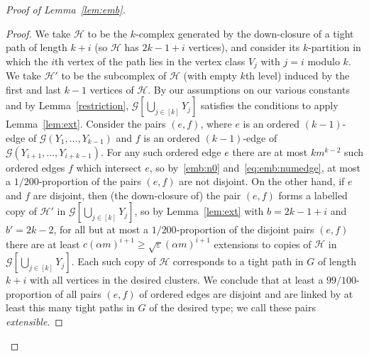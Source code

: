\documentclass[12pt,a4paper]{amsart}
\let\eps\varepsilon
\newcommand{\oldqed}{}
\def\endofClaim{\hfill\scalebox{.6}{$\Box$}}
\newenvironment{claimproof}[1][Proof]{
  \renewcommand{\oldqed}{\qedsymbol}
  \renewcommand{\qedsymbol}{\endofClaim}
  \begin{proof}[#1]
}{
  \end{proof}
  \renewcommand{\qedsymbol}{\oldqed}
}
\newcommand{\cG}{\mathcal{G}}
\begin{document}
\begin{proof}[Proof of Lemma~\ref{lem:emb}]
 \begin{claimproof}
  We take $\mathcal{H}$ to be the $k$-complex generated by the down-closure of a
  tight path of length $k+i$ (so $\mathcal{H}$ has $2k-1+i$ vertices), and
  consider its $k$-partition in which the $i$th vertex of the path lies in the
  vertex class $V_j$ with $j = i$ modulo $k$. We take $\mathcal{H'}$ to be the
  subcomplex of $\mathcal{H}$ (with empty $k$th level) induced by the first and last $k-1$
  vertices of $\mathcal{H}$. By our assumptions on our various constants and
  by Lemma~\ref{restriction}, $\cG[\bigcup_{j \in [k]} Y_j]$ satisfies the
  conditions to apply Lemma~\ref{lem:ext}. Consider the pairs $(e, f)$, where
  $e$ is an ordered $(k-1)$-edge of $\cG(Y_1,\ldots,Y_{k-1})$ and $f$ is an ordered $(k-1)$-edge of $\cG(Y_{i+1},\ldots,Y_{i + k-1})$. For any such ordered edge $e$ there
  are at most $k m^{k-2}$ such ordered edges $f$ which intersect $e$, so by~\eqref{emb:n0} and~\eqref{eq:emb:numedge}, at most
  a $1/200$-proportion of the pairs $(e, f)$ are not disjoint. On the other hand,
  if $e$ and $f$ are disjoint, then (the down-closure of) the pair $(e, f)$ forms a labelled copy of
  $\mathcal{H'}$ in $\cG[\bigcup_{j\in[k]} Y_j]$, so by Lemma~\ref{lem:ext} with $b=2k-1+i$ and $b'=2k-2$, for all but at most a
  $1/200$-proportion of the disjoint pairs $(e, f)$ there are at least $c(\alpha
  m)^{i+1}\ge\sqrt{\eps} (\alpha  m)^{i+1}$ extensions to copies of
  $\mathcal{H}$ in $\cG[\bigcup_{j\in[k]} Y_j]$. Each such copy of $\mathcal{H}$ corresponds to a 
  tight path in $G$ of length $k+i$ with all vertices in the
  desired clusters. We conclude that at least a $99/100$-proportion of all pairs
  $(e, f)$ of ordered edges are disjoint and are linked by at least this many tight paths in $G$ 
  of the desired type; we call these pairs \emph{extensible}.


\end{claimproof}
\end{proof}
\end{document}
